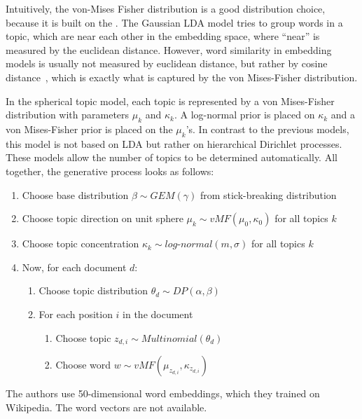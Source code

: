 \documentclass[
        a4paper,
        titlepage,
        twoside,
        parskip
        ]{scrbook}
\theoremstyle{break}
\begin{document}
Intuitively, the von-Mises Fisher distribution is a good distribution choice, because it is built on the .
The Gaussian LDA model tries to group words in a topic, which are near each other in the embedding space, where ``near'' is measured by the euclidean distance.
However, word similarity in embedding models is usually not measured by euclidean distance, but rather by cosine distance~\cite{Mikolov2013a}, which is exactly what is captured by the von Mises-Fisher distribution.

In the spherical topic model, each topic is represented by a von Mises-Fisher distribution with parameters $\mu_k$ and $\kappa_k$.
A log-normal prior is placed on $\kappa_k$ and a von Mises-Fisher prior is placed on the $\mu_k$'s.
In contrast to the previous models, this model is not based on LDA but rather on hierarchical Dirichlet processes.
These models allow the number of topics to be determined automatically.
All together, the generative process looks as follows:
\begin{enumerate}
    \item Choose base distribution $\beta \sim GEM(\gamma)$ from stick-breaking distribution
    \item Choose topic direction on unit sphere $\mu_k \sim vMF(\mu_0, \kappa_0)$ for all topics $k$
    \item Choose topic concentration $\kappa_k \sim log\mbox{-}normal(m, \sigma)$ for all topics $k$
    \item Now, for each document $d$:
    \begin{enumerate}
        \item Choose topic distribution $\theta_d \sim DP(\alpha, \beta)$
        \item For each position $i$ in the document
        \begin{enumerate}
            \item Choose topic $z_{d,i} \sim Multinomial(\theta_d)$
            \item Choose word $w \sim vMF(\mu_{z_{d,i}}, \kappa_{z_{d,i}})$
        \end{enumerate}
    \end{enumerate}
\end{enumerate}

The authors use 50-dimensional word embeddings, which they trained on Wikipedia.
The word vectors are not available.
\end{document}
